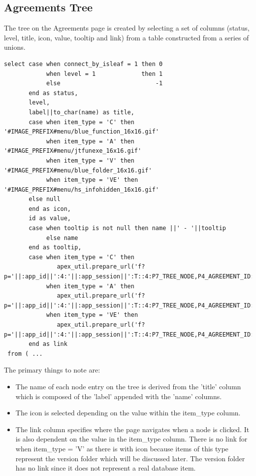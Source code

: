 \documentclass{report}
\begin{document}
\subsection{Agreements Tree}
The tree on the Agreements page is created by selecting a set of columns (status, level, title, icon, value, tooltip and link) from a table constructed from a series of unions.
\begin{lstlisting}[caption=Agreement tree select statement]
select case when connect_by_isleaf = 1 then 0
            when level = 1             then 1
            else                           -1
       end as status, 
       level,
       label||to_char(name) as title, 
       case when item_type = 'C' then '#IMAGE_PREFIX#menu/blue_function_16x16.gif' 
            when item_type = 'A' then '#IMAGE_PREFIX#menu/jtfunexe_16x16.gif'
            when item_type = 'V' then '#IMAGE_PREFIX#menu/blue_folder_16x16.gif'
            when item_type = 'VE' then '#IMAGE_PREFIX#menu/hs_infohidden_16x16.gif'
       else null
       end as icon, 
       id as value, 
       case when tooltip is not null then name ||' - '||tooltip
            else name
       end as tooltip,
       case when item_type = 'C' then 
               apex_util.prepare_url('f?p='||:app_id||':4:'||:app_session||':T::4:P7_TREE_NODE,P4_AGREEMENT_ID:'||id||','||id)
            when item_type = 'A' then
               apex_util.prepare_url('f?p='||:app_id||':4:'||:app_session||':T::4:P7_TREE_NODE,P4_AGREEMENT_ID:'||id||','||id)
            when item_type = 'VE' then 
               apex_util.prepare_url('f?p='||:app_id||':4:'||:app_session||':T::4:P7_TREE_NODE,P4_AGREEMENT_ID:'||id||','||id)
       end as link 
 from ( ...
\end{lstlisting}
The primary things to note are:
\begin{itemize}
	\item The name of each node entry on the tree is derived from the 'title' column which is composed of the 'label' appended with the 'name' columns.
  \item The icon is selected depending on the value within the item\_type column.
  \item The link column specifies where the page navigates when a node is clicked.  It is also dependent on the value in the item\_type column.  There is no link for when item\_type = 'V' as there is with icon because items of this type represent the version folder which will be discussed later.  The version folder has no link since it does not represent a real database item.
\end{itemize}
\end{document}
